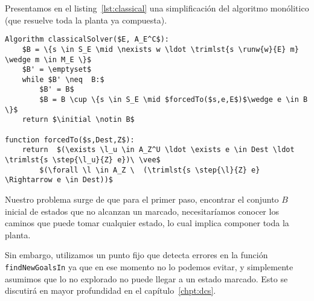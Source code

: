 Presentamos en el listing~\ref{lst:classical} una simplificación del algoritmo monólitico (que resuelve toda la planta ya compuesta).

\begin{lstlisting}[language={pseudocode},label={lst:classical},caption={Algoritmo Monolítico},float=ht]
Algorithm classicalSolver($E, A_E^C$):
	$B = \{s \in S_E \mid \nexists w \ldot \trimlst{s \runw{w}{E} m} \wedge m \in M_E \}$
	$B' = \emptyset$
	while $B' \neq  B:$
		$B' = B$
		$B = B \cup \{s \in S_E \mid $forcedTo($s,e,E$)$\wedge e \in B \}$
	return $\initial \notin B$
	
function forcedTo($s,Dest,Z$):
	return  $(\exists \l_u \in A_Z^U \ldot \exists e \in Dest \ldot \trimlst{s \step{\l_u}{Z} e})\ \vee$
		$(\forall \l \in A_Z \  (\trimlst{s \step{\l}{Z} e} \Rightarrow e \in Dest))$    
\end{lstlisting}

Nuestro problema surge de que para el primer paso, encontrar el conjunto $B$ inicial de estados que no alcanzan un marcado, necesitaríamos conocer los caminos que puede tomar cualquier estado, lo cual implica componer toda la planta.

Sin embargo, utilizamos un punto fijo que detecta errores en la función \texttt{findNewGoalsIn} ya que en ese momento no lo podemos evitar, y simplemente asumimos que lo no explorado no puede llegar a un estado marcado. Esto se discutirá en mayor profundidad en el capítulo~\ref{chpt:dcs}.
